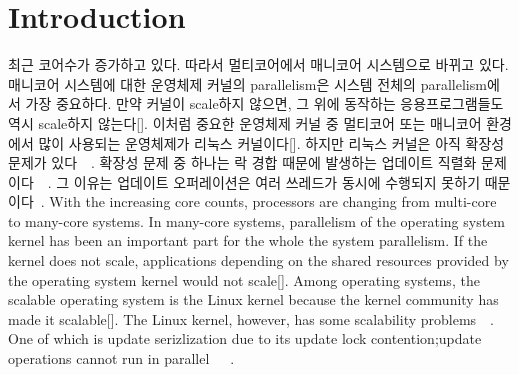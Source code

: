\section{Introduction} \label{sec:introduction}

\ifkor
최근 코어수가 증가하고 있다. 따라서 멀티코어에서 매니코어 시스템으로 바뀌고 있다. 
매니코어 시스템에 대한 운영체제 커널의 parallelism은 시스템 전체의 parallelism에서 가장 중요하다. 
만약 커널이 scale하지 않으면, 그 위에 동작하는 응용프로그램들도 역시 scale하지 않는다[].
이처럼 중요한 운영체제 커널 중 멀티코어 또는 매니코어 환경에서 많이 사용되는 운영체제가 리눅스 커널이다[].
하지만 리눅스 커널은 아직 확장성 문제가
있다~\cite{SilasBoydWickizer2010LinuxScales48}~\cite{Changwoo2016UMSF}.
확장성 문제 중 하나는 락 경합 때문에 발생하는 업데이트 직렬화
문제이다~\cite{Matveev2015RLU}~\cite{Dodds2015SCT}.
그 이유는 업데이트 오퍼레이션은 여러 쓰레드가 동시에 수행되지 못하기
때문이다~\cite{mckenney2011parallel}.
\else
With the increasing core counts, processors are changing from multi-core to
many-core systems.
In many-core systems, parallelism of the operating system kernel has been an
important part for the whole the system parallelism.
If the kernel does not scale, applications depending on the shared
resources provided by the operating system kernel would not scale[].
Among operating systems, the scalable operating system is the Linux kernel
because the kernel community has made it scalable[].
The Linux kernel, however, has some scalability
problems~\cite{SilasBoydWickizer2010LinuxScales48}~\cite{Changwoo2016UMSF}.
One of which is update serizlization due to its update lock
contention;update operations cannot run in
parallel~\cite{mckenney2011parallel}~\cite{Matveev2015RLU}~\cite{Dodds2015SCT}.
\fi


